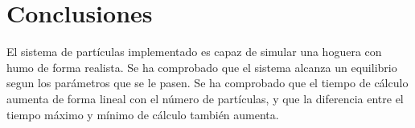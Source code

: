 \documentclass{article}
\begin{document}
\section{Conclusiones}

El sistema de partículas implementado es capaz de simular una hoguera con humo de forma realista. Se ha comprobado que el sistema alcanza un equilibrio segun los parámetros que se le pasen. Se ha comprobado que el tiempo de cálculo aumenta de forma lineal con el número de partículas, y que la diferencia entre el tiempo máximo y mínimo de cálculo también aumenta.
\end{document}
